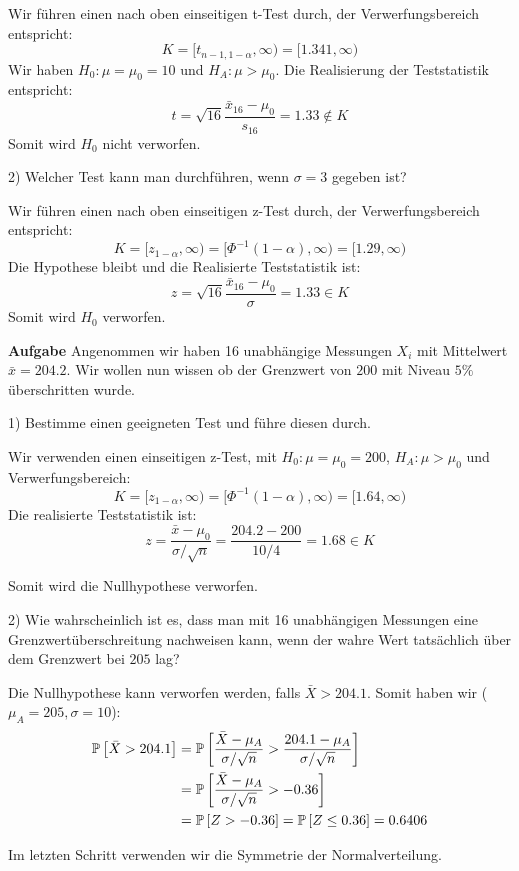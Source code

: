 Wir führen einen nach oben einseitigen t-Test durch, der Verwerfungsbereich entspricht:
$$K = [t_{n-1, 1 - \alpha }, \infty) = [1.341, \infty)$$
Wir haben $H_0 : \mu = \mu_0 = 10$ und $H_A: \mu > \mu_0$. Die Realisierung der Teststatistik entspricht:
$$t = \sqrt {16} \frac{\bar x_{16} - \mu_0}{s_{16}} = 1.33 \notin K$$
Somit wird $H_0$ nicht verworfen. \smallskip

2) Welcher Test kann man durchführen, wenn $\sigma = 3$ gegeben ist? \smallskip

Wir führen einen nach oben einseitigen z-Test durch, der Verwerfungsbereich entspricht:
$$K = [z_{1 - \alpha }, \infty) = [\Phi^{-1}(1 - \alpha), \infty) = [1.29, \infty)$$
Die Hypothese bleibt und die Realisierte Teststatistik ist:
$$z = \sqrt {16} \frac{\bar x_{16} - \mu_0}{\sigma} = 1.33 \in K$$
Somit wird $H_0$ verworfen.

\hrulefill

\textbf{Aufgabe}
Angenommen wir haben 16 unabhängige Messungen $X_i$ mit Mittelwert $\bar x = 204.2$. Wir wollen nun wissen ob der Grenzwert von $200$ mit Niveau $5\%$ überschritten wurde. \smallskip

1) Bestimme einen geeigneten Test und führe diesen durch.

Wir verwenden einen einseitigen z-Test, mit $H_0 : \mu = \mu_0 = 200$, $H_A : \mu > \mu_0$ und Verwerfungsbereich:
$$K = [z_{1-\alpha}, \infty) = [\Phi^{-1}(1 - \alpha), \infty) = [1.64, \infty)$$
Die realisierte Teststatistik ist:
$$z = \frac{\bar x - \mu_0}{\sigma / \sqrt{n}} = \frac{204.2 - 200}{10/ 4} = 1.68 \in K$$

Somit wird die Nullhypothese verworfen.\smallskip

2) Wie wahrscheinlich ist es, dass man mit 16 unabhängigen Messungen eine Grenzwertüberschreitung nachweisen kann, wenn der wahre Wert tatsächlich über dem Grenzwert bei $205$ lag?

Die Nullhypothese kann verworfen werden, falls $\bar X > 204.1$. Somit haben wir ($\mu_A = 205, \sigma = 10$):
\begin{align*}
	\mathbb{P} \left[ \bar X > 204.1 \right] &= \mathbb{P} \left[ \frac{\bar X - \mu_A}{\sigma / \sqrt n} > \frac{204.1 - \mu_A}{\sigma / \sqrt n} \right] \\
	&= \mathbb{P} \left[ \frac{\bar X - \mu_A}{\sigma / \sqrt n} > -0.36 \right] \\
	&= \mathbb{P} \left[ Z > -0.36 \right] = \mathbb{P} \left[ Z \leq 0.36 \right] = 0.6406
\end{align*}

Im letzten Schritt verwenden wir die Symmetrie der Normalverteilung. \smallskip

